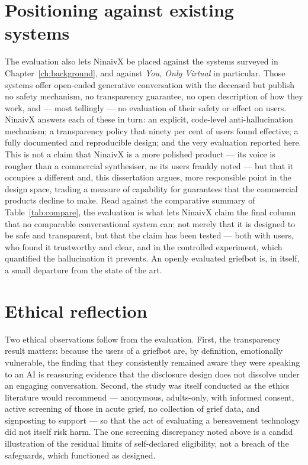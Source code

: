 \documentclass[11pt,a4paper]{report}
\begin{document}
\section{Positioning against existing systems}
The evaluation also lets NinaivX be placed against the systems surveyed in Chapter~\ref{ch:background}, and against \emph{You, Only Virtual} in particular. Those systems offer open-ended generative conversation with the deceased but publish no safety mechanism, no transparency guarantee, no open description of how they work, and --- most tellingly --- no evaluation of their safety or effect on users. NinaivX answers each of these in turn: an explicit, code-level anti-hallucination mechanism; a transparency policy that ninety per cent of users found effective; a fully documented and reproducible design; and the very evaluation reported here. This is not a claim that NinaivX is a more polished product --- its voice is rougher than a commercial synthesiser, as its users frankly noted --- but that it occupies a different and, this dissertation argues, more responsible point in the design space, trading a measure of capability for guarantees that the commercial products decline to make. Read against the comparative summary of Table~\ref{tab:compare}, the evaluation is what lets NinaivX claim the final column that no comparable conversational system can: not merely that it is designed to be safe and transparent, but that the claim has been tested --- both with users, who found it trustworthy and clear, and in the controlled experiment, which quantified the hallucination it prevents. An openly evaluated griefbot is, in itself, a small departure from the state of the art.

\section{Ethical reflection}
Two ethical observations follow from the evaluation. First, the transparency result matters: because the users of a griefbot are, by definition, emotionally vulnerable, the finding that they consistently remained aware they were speaking to an AI is reassuring evidence that the disclosure design does not dissolve under an engaging conversation. Second, the study was itself conducted as the ethics literature would recommend --- anonymous, adults-only, with informed consent, active screening of those in acute grief, no collection of grief data, and signposting to support --- so that the act of evaluating a bereavement technology did not itself risk harm. The one screening discrepancy noted above is a candid illustration of the residual limits of self-declared eligibility, not a breach of the safeguards, which functioned as designed.
\end{document}
